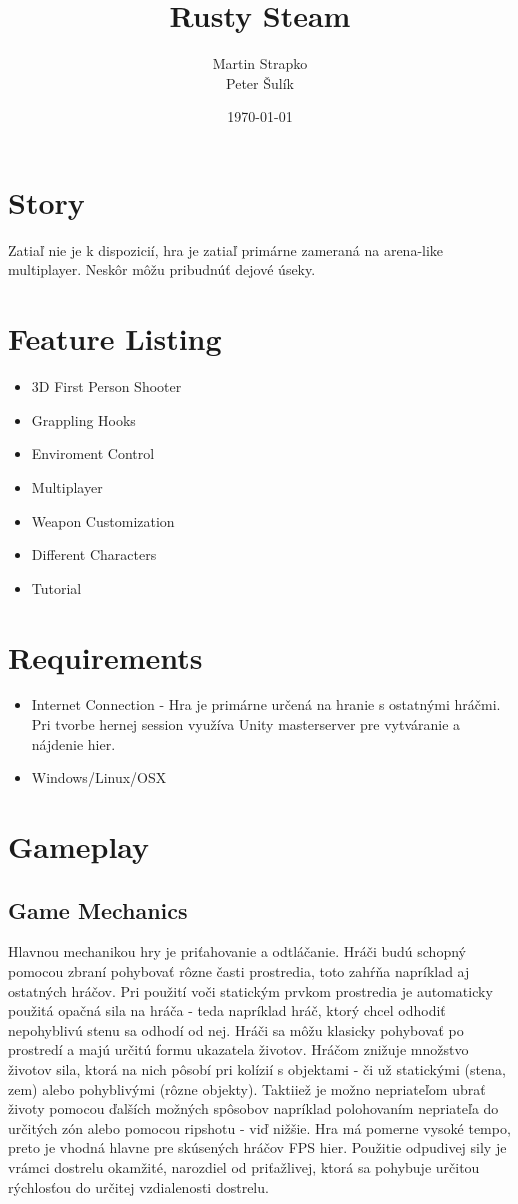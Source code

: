 \documentclass[a4paper]{report}
\title{Rusty Steam}
\author{Martin Strapko \\ Peter Šulík}
\date{\today}
\begin{document}
\maketitle

\tableofcontents
 
\chapter{Story}
Zatiaľ nie je k dispozicií, hra je zatiaľ primárne zameraná na arena-like multiplayer. Neskôr môžu pribudnúť dejové úseky.
 
\chapter{Feature Listing}
\begin{itemize}
  \item 3D First Person Shooter
  \item Grappling Hooks
  \item Enviroment Control
  \item Multiplayer
  \item Weapon Customization
  \item Different Characters
  \item Tutorial
\end{itemize}

\chapter{Requirements}
\begin{itemize}
  \item Internet Connection - Hra je primárne určená na hranie s ostatnými hráčmi. Pri tvorbe hernej session využíva Unity masterserver pre vytváranie a nájdenie hier.
  \item Windows/Linux/OSX
\end{itemize}


\chapter{Gameplay}
\section{Game Mechanics}
 Hlavnou mechanikou hry je priťahovanie a odtláčanie. Hráči budú schopný pomocou zbraní pohybovať rôzne časti prostredia, toto zahŕňa napríklad aj ostatných hráčov. Pri použití voči statickým prvkom prostredia je automaticky použitá opačná sila na hráča - teda napríklad hráč, ktorý chcel odhodiť nepohyblivú stenu sa odhodí od nej. Hráči sa môžu klasicky pohybovať po prostredí a majú určitú formu ukazatela životov. Hráčom znižuje množstvo životov sila, ktorá na nich pôsobí pri kolízií s objektami - či už statickými (stena, zem) alebo pohyblivými (rôzne objekty). Taktiiež je možno nepriateľom ubrať životy pomocou ďalších možných spôsobov napríklad polohovaním nepriateľa do určitých zón alebo pomocou ripshotu - viď nižšie.  Hra má pomerne vysoké tempo, preto je vhodná hlavne pre skúsených hráčov FPS hier. Použitie odpudivej sily je vrámci dostrelu okamžité, narozdiel od priťažlivej, ktorá sa pohybuje určitou rýchlosťou do určitej vzdialenosti dostrelu.
\end{document}
